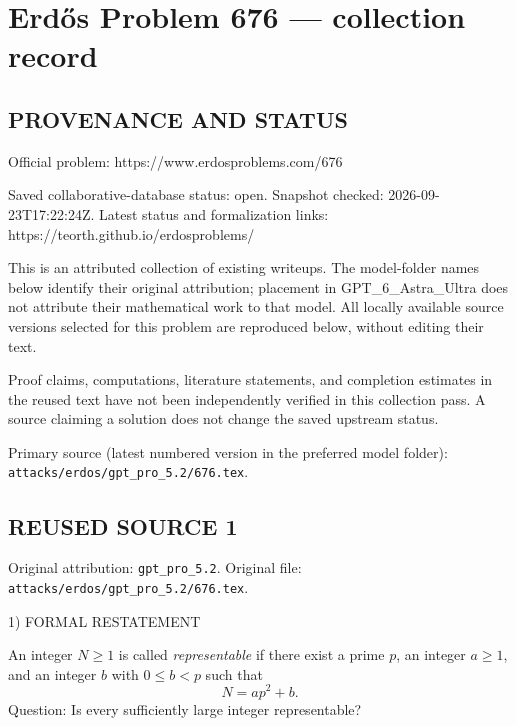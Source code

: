 \section*{Erd\H{o}s Problem 676 --- collection record}

\subsection*{PROVENANCE AND STATUS}
Official problem: https://www.erdosproblems.com/676

Saved collaborative-database status: open.
Snapshot checked: 2026-09-23T17:22:24Z.
Latest status and formalization links: https://teorth.github.io/erdosproblems/

This is an attributed collection of existing writeups. The model-folder names below identify their original attribution; placement in GPT\_6\_Astra\_Ultra does not attribute their mathematical work to that model. All locally available source versions selected for this problem are reproduced below, without editing their text.

Proof claims, computations, literature statements, and completion estimates in the reused text have not been independently verified in this collection pass. A source claiming a solution does not change the saved upstream status.

Primary source (latest numbered version in the preferred model folder): \texttt{attacks/erdos/gpt\_pro\_5.2/676.tex}.

\subsection*{REUSED SOURCE 1}
Original attribution: \texttt{gpt\_pro\_5.2}.
Original file: \texttt{attacks/erdos/gpt\_pro\_5.2/676.tex}.


1) FORMAL RESTATEMENT

An integer $N\ge 1$ is called \emph{representable} if there exist a prime $p$, an integer $a\ge 1$, and an integer $b$ with $0\le b<p$ such that
\[
 N=ap^2+b.
\]
Question: Is every sufficiently large integer representable?

